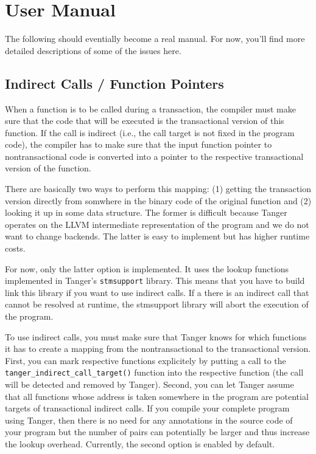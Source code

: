 
\section{User Manual}

The following should eventially become a real manual. For now, you'll find
more detailed descriptions of some of the issues here.

\subsection{Indirect Calls / Function Pointers}

When a function is to be called during a transaction, the compiler must make
sure that the code that will be executed is the transactional version of this
function. If the call is indirect (i.e., the call target is not fixed in
the program code), the compiler has to make sure that the input function
pointer to nontransactional code is converted into a pointer to the
respective transactional version of the function.

There are basically two ways to perform this mapping: (1) getting the
transaction version directly from somwhere in the binary code of the original
function and (2) looking it up in some data structure. The former is
difficult because Tanger operates on the LLVM intermediate representation of
the program and we do not want to change backends. The latter is easy to
implement but has higher runtime costs.

For now, only the latter option is implemented. It uses the lookup functions
implemented in Tanger's \texttt{stmsupport} library. This means that you have
to build link this library if you want to use indirect calls. If a there is
an indirect call that cannot be resolved at runtime, the stmsupport library
will abort the execution of the program.

To use indirect calls, you must make sure that Tanger knows for which functions
it has to create a mapping from the nontransactional to the transactional
version. First, you can mark respective functions explicitely by putting a call
to the \texttt{tanger_indirect_call_target()} function into the respective
function (the call will be detected and removed by Tanger). Second, you can
let Tanger assume that all functions whose address is taken somewhere in the
program are potential targets of transactional indirect calls. If
you compile your complete program using Tanger, then there is no
need for any annotations in the source code of your program but the number of
pairs can potentially be larger and thus increase the lookup overhead.
Currently, the second option is enabled by default.


